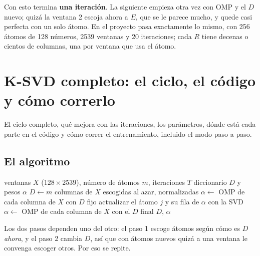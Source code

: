 \documentclass[11pt,letterpaper]{article}
\begin{document}
Con esto termina \textbf{una iteración}. La siguiente empieza otra vez
con OMP y el $D$ nuevo; quizá la ventana 2 escoja ahora a $E$, que se
le parece mucho, y quede casi perfecta con un solo átomo. En el
proyecto pasa exactamente lo mismo, con 256 átomos de 128 números,
2539 ventanas y 20 iteraciones; cada $R$ tiene decenas o cientos de
columnas, una por ventana que usa el átomo.

\newpage


\section{K-SVD completo: el ciclo, el código y cómo correrlo}

\begin{quick_sum}
    El ciclo completo, qué mejora con las iteraciones, los parámetros,
    dónde está cada parte en el código y cómo correr el entrenamiento,
    incluido el modo paso a paso.
\end{quick_sum}

\subsection*{El algoritmo}

\begin{algorithm}[H]
\caption{K-SVD}
\begin{algorithmic}[1]
    \Require ventanas $X$ ($128 \times 2539$), número de átomos $m$,
             iteraciones $T$
    \Ensure diccionario $D$ y pesos $\alpha$
    \State $D \gets m$ columnas de $X$ escogidas al azar, normalizadas
        \State $\alpha \gets$ OMP de cada columna de $X$ con $D$ fijo
         
            \State actualizar el átomo $j$ y su fila de $\alpha$ con la
                   SVD
        \EndFor
    \EndFor
    \State $\alpha \gets$ OMP de cada columna de $X$ con el $D$ final
    \State \Return $D$, $\alpha$
\end{algorithmic}
\end{algorithm}

Los dos pasos dependen uno del otro: el paso 1 escoge átomos según
cómo es $D$ \emph{ahora}, y el paso 2 cambia $D$, así que con átomos
nuevos quizá a una ventana le convenga escoger otros. Por eso se
repite.
\end{document}
